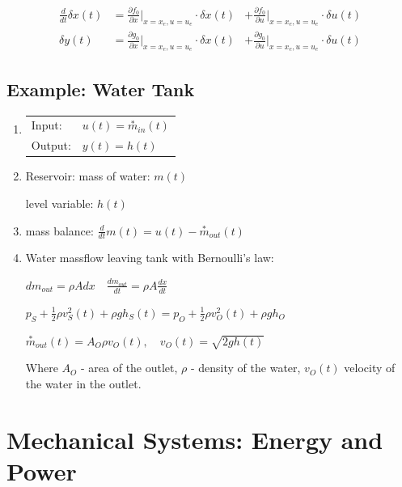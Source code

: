 \documentclass[10pt,a4paper]{scrartcl}
\begin{document}
\begin{multicols*}{3}
\begin{alignat*}{3}
\frac{d}{dt}\delta x(t) &= \frac{\partial f_0}{\partial x}|_{x=x_e,u=u_e}\cdot \delta x(t)&+\frac{\partial f_0}{\partial u}|_{x=x_e,u=u_e}\cdot \delta u(t)\\
\delta y(t)&=\frac{\partial g_0}{\partial x}|_{x=x_e,u=u_e}\cdot\delta x(t) &+\frac{\partial g_0}{\partial u}|_{x=x_e,u=u_e}\cdot\delta u(t)
\end{alignat*}
	
\vfill
\null
\columnbreak

\subsection{Example: Water Tank}


\begin{enumerate}
\item \begin{tabular}{ll}Input:&$u(t)=\overset{\ast}{m}_{in}(t)$\\Output:&$y(t)=h(t)$\end{tabular}
\item Reservoir: mass of water: $m(t)$

level variable: $h(t)$
\item mass balance: $\frac{d}{dt}m(t)=u(t)-\overset{\ast}{m}_{out}(t)$
\item Water massflow leaving tank with Bernoulli's law:

$dm_{out}=\rho A dx\quad \frac{dm_{out}}{dt}=\rho A \frac{dx}{dt}$

$p_S+\frac{1}{2}\rho v_S^2(t)+\rho gh_S(t)=p_O+\frac{1}{2}\rho v_O^2(t)+\rho g h_O$

$\overset{\ast}{m}_{out}(t)=A_O\rho v_O(t),\quad v_O(t)=\sqrt{2gh(t)}$

Where $A_O$ - area of the outlet, $\rho$ - density of the water, $v_O(t)$ velocity of the water in the outlet.
\end{enumerate}

\vfill
\null
\newpage

\section{Mechanical Systems: Energy and Power}




\end{multicols*}
\end{document}
